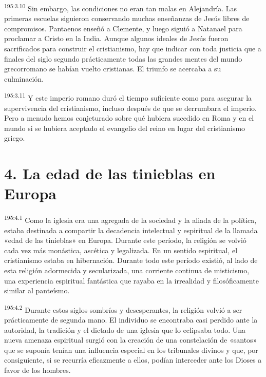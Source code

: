 \par
\textsuperscript{195:3.10} Sin embargo, las condiciones no eran tan malas en Alejandría. Las primeras escuelas siguieron conservando muchas enseñanzas de Jesús libres de compromisos. Pantaenos enseñó a Clemente, y luego siguió a Natanael para proclamar a Cristo en la India. Aunque algunos ideales de Jesús fueron sacrificados para construir el cristianismo, hay que indicar con toda justicia que a finales del siglo segundo prácticamente todas las grandes mentes del mundo grecorromano se habían vuelto cristianas. El triunfo se acercaba a su culminación.

\par
\textsuperscript{195:3.11} Y este imperio romano duró el tiempo suficiente como para asegurar la supervivencia del cristianismo, incluso después de que se derrumbara el imperio. Pero a menudo hemos conjeturado sobre qué hubiera sucedido en Roma y en el mundo si se hubiera aceptado el evangelio del reino en lugar del cristianismo griego.

\section*{4. La edad de las tinieblas en Europa}
\par
\textsuperscript{195:4.1} Como la iglesia era una agregada de la sociedad y la aliada de la política, estaba destinada a compartir la decadencia intelectual y espiritual de la llamada «edad de las tinieblas» en Europa. Durante este período, la religión se volvió cada vez más monástica, ascética y legalizada. En un sentido espiritual, el cristianismo estaba en hibernación. Durante todo este período existió, al lado de esta religión adormecida y secularizada, una corriente continua de misticismo, una experiencia espiritual fantástica que rayaba en la irrealidad y filosóficamente similar al panteísmo.

\par
\textsuperscript{195:4.2} Durante estos siglos sombríos y desesperantes, la religión volvió a ser prácticamente de segunda mano. El individuo se encontraba casi perdido ante la autoridad, la tradición y el dictado de una iglesia que lo eclipsaba todo. Una nueva amenaza espiritual surgió con la creación de una constelación de «santos» que se suponía tenían una influencia especial en los tribunales divinos y que, por consiguiente, si se recurría eficazmente a ellos, podían interceder ante los Dioses a favor de los hombres.

